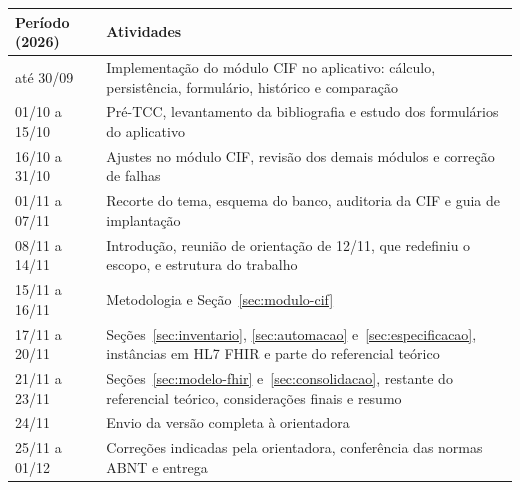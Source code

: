 \begin{quadro}[htb]
	\centering
	\caption{Cronograma do TCC 1}
	\label{qua:cronograma}
	\footnotesize
	\begin{tabularx}{\textwidth}{|p{3.2cm}|X|}
		\hline
		Período (2026) & Atividades \\ \hline
		até 30/09 & Implementação do módulo CIF no aplicativo: cálculo, persistência, formulário, histórico e
			comparação \\ \hline
		01/10 a 15/10 & Pré-TCC, levantamento da bibliografia e estudo dos formulários do aplicativo \\ \hline
		16/10 a 31/10 & Ajustes no módulo CIF, revisão dos demais módulos e correção de falhas \\ \hline
		01/11 a 07/11 & Recorte do tema, esquema do banco, auditoria da CIF e guia de implantação \\ \hline
		08/11 a 14/11 & Introdução, reunião de orientação de 12/11, que redefiniu o escopo, e estrutura do trabalho \\ \hline
		15/11 a 16/11 & Metodologia e Seção~\ref{sec:modulo-cif} \\ \hline
		17/11 a 20/11 & Seções~\ref{sec:inventario}, \ref{sec:automacao} e~\ref{sec:especificacao}, instâncias em HL7
			FHIR e parte do referencial teórico \\ \hline
		21/11 a 23/11 & Seções~\ref{sec:modelo-fhir} e~\ref{sec:consolidacao}, restante do referencial teórico,
			considerações finais e resumo \\ \hline
		24/11 & Envio da versão completa à orientadora \\ \hline
		25/11 a 01/12 & Correções indicadas pela orientadora, conferência das normas ABNT e entrega \\ \hline
	\end{tabularx}
\end{quadro}
